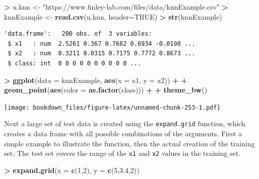 \documentclass[
]{krantz}
\makeatletter
\newenvironment{Shaded}{\begin{snugshade}}{\end{snugshade}}
\newcommand{\DataTypeTok}[1]{\textcolor[rgb]{0.27,0.27,0.27}{#1}}
\newcommand{\DecValTok}[1]{\textcolor[rgb]{0.06,0.06,0.06}{#1}}
\newcommand{\FloatTok}[1]{\textcolor[rgb]{0.06,0.06,0.06}{#1}}
\newcommand{\KeywordTok}[1]{\textcolor[rgb]{0.27,0.27,0.27}{\textbf{#1}}}
\newcommand{\NormalTok}[1]{#1}
\newcommand{\OperatorTok}[1]{\textcolor[rgb]{0.43,0.43,0.43}{\textbf{#1}}}
\newcommand{\OtherTok}[1]{\textcolor[rgb]{0.37,0.37,0.37}{#1}}
\newcommand{\StringTok}[1]{\textcolor[rgb]{0.5,0.5,0.5}{#1}}
\newenvironment{kframe}{%
\medskip{}
\setlength{\fboxsep}{.8em}
 \def\at@end@of@kframe{}%
 \ifinner\ifhmode%
  \def\at@end@of@kframe{\end{minipage}}%
  \begin{minipage}{\columnwidth}%
 \fi\fi%
 \def\FrameCommand##1{\hskip\@totalleftmargin \hskip-\fboxsep
 \colorbox{shadecolor}{##1}\hskip-\fboxsep
     \hskip-\linewidth \hskip-\@totalleftmargin \hskip\columnwidth}%
 \MakeFramed {\advance\hsize-\width
   \@totalleftmargin\z@ \linewidth\hsize
   \@setminipage}}%
 {\par\unskip\endMakeFramed%
 \at@end@of@kframe}
\renewenvironment{Shaded}{\begin{kframe}}{\end{kframe}}
\makeatother
\begin{document}
\begin{Shaded}
\begin{Highlighting}[]
\OperatorTok{\textgreater{}}\StringTok{ }\NormalTok{u.knn \textless{}{-}}\StringTok{ "https://www.finley{-}lab.com/files/data/knnExample.csv"}
\OperatorTok{\textgreater{}}\StringTok{ }\NormalTok{knnExample \textless{}{-}}\StringTok{ }\KeywordTok{read.csv}\NormalTok{(u.knn, }\DataTypeTok{header=}\OtherTok{TRUE}\NormalTok{)}
\OperatorTok{\textgreater{}}\StringTok{ }\KeywordTok{str}\NormalTok{(knnExample)}
\end{Highlighting}
\end{Shaded}

\begin{verbatim}
'data.frame':   200 obs. of  3 variables:
 $ x1   : num  2.5261 0.367 0.7682 0.6934 -0.0198 ...
 $ x2   : num  0.3211 0.0315 0.7175 0.7772 0.8673 ...
 $ class: int  0 0 0 0 0 0 0 0 0 0 ...
\end{verbatim}

\begin{Shaded}
\begin{Highlighting}[]
\OperatorTok{\textgreater{}}\StringTok{ }\KeywordTok{ggplot}\NormalTok{(}\DataTypeTok{data =}\NormalTok{ knnExample, }\KeywordTok{aes}\NormalTok{(}\DataTypeTok{x =}\NormalTok{ x1, }\DataTypeTok{y =}\NormalTok{ x2)) }\OperatorTok{+}\StringTok{ }
\OperatorTok{+}\StringTok{    }\KeywordTok{geom\_point}\NormalTok{(}\KeywordTok{aes}\NormalTok{(}\DataTypeTok{color =} \KeywordTok{as.factor}\NormalTok{(class))) }\OperatorTok{+}
\OperatorTok{+}\StringTok{    }\KeywordTok{theme\_bw}\NormalTok{()}
\end{Highlighting}
\end{Shaded}

\texttt{[image: bookdown\_files/figure-latex/unnamed-chunk-253-1.pdf]}

Next a large set of test data is created using the \texttt{expand.grid} function, which creates a data frame with all possible combinations of the arguments. First a simple example to illustrate the function, then the actual creation of the training set. The test set covers the range of the \texttt{x1} and \texttt{x2} values in the training set.

\begin{Shaded}
\begin{Highlighting}[]
\OperatorTok{\textgreater{}}\StringTok{ }\KeywordTok{expand.grid}\NormalTok{(}\DataTypeTok{x =} \KeywordTok{c}\NormalTok{(}\DecValTok{1}\NormalTok{,}\DecValTok{2}\NormalTok{), }\DataTypeTok{y =} \KeywordTok{c}\NormalTok{(}\DecValTok{5}\NormalTok{,}\FloatTok{3.4}\NormalTok{,}\DecValTok{2}\NormalTok{))}
\end{Highlighting}
\end{Shaded}
\end{document}
